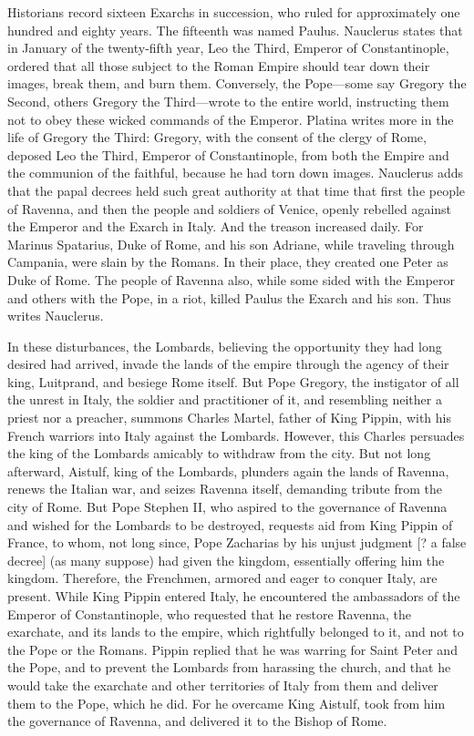 Historians record sixteen Exarchs in succession, who ruled for approximately one hundred and eighty years. The fifteenth was named Paulus. Nauclerus states that in January of the twenty-fifth year, Leo the Third, Emperor of Constantinople, ordered that all those subject to the Roman Empire should tear down their images, break them, and burn them. Conversely, the Pope—some say Gregory the Second, others Gregory the Third—wrote to the entire world, instructing them not to obey these wicked commands of the Emperor. Platina writes more in the life of Gregory the Third: Gregory, with the consent of the clergy of Rome, deposed Leo the Third, Emperor of Constantinople, from both the Empire and the communion of the faithful, because he had torn down images. Nauclerus adds that the papal decrees held such great authority at that time that first the people of Ravenna, and then the people and soldiers of Venice, openly rebelled against the Emperor and the Exarch in Italy. And the treason increased daily. For Marinus Spatarius, Duke of Rome, and his son Adriane, while traveling through Campania, were slain by the Romans. In their place, they created one Peter as Duke of Rome. The people of Ravenna also, while some sided with the Emperor and others with the Pope, in a riot, killed Paulus the Exarch and his son. Thus writes Nauclerus.

In these disturbances, the Lombards, believing the opportunity they had long desired had arrived, invade the lands of the empire through the agency of their king, Luitprand, and besiege Rome itself. But Pope Gregory, the instigator of all the unrest in Italy, the soldier and practitioner of it, and resembling neither a priest nor a preacher, summons Charles Martel, father of King Pippin, with his French warriors into Italy against the Lombards. However, this Charles persuades the king of the Lombards amicably to withdraw from the city. But not long afterward, Aistulf, king of the Lombards, plunders again the lands of Ravenna, renews the Italian war, and seizes Ravenna itself, demanding tribute from the city of Rome. But Pope Stephen II, who aspired to the governance of Ravenna and wished for the Lombards to be destroyed, requests aid from King Pippin of France, to whom, not long since, Pope Zacharias by his unjust judgment [? a false decree] (as many suppose) had given the kingdom, essentially offering him the kingdom. Therefore, the Frenchmen, armored and eager to conquer Italy, are present. While King Pippin entered Italy, he encountered the ambassadors of the Emperor of Constantinople, who requested that he restore Ravenna, the exarchate, and its lands to the empire, which rightfully belonged to it, and not to the Pope or the Romans. Pippin replied that he was warring for Saint Peter and the Pope, and to prevent the Lombards from harassing the church, and that he would take the exarchate and other territories of Italy from them and deliver them to the Pope, which he did. For he overcame King Aistulf, took from him the governance of Ravenna, and delivered it to the Bishop of Rome.

